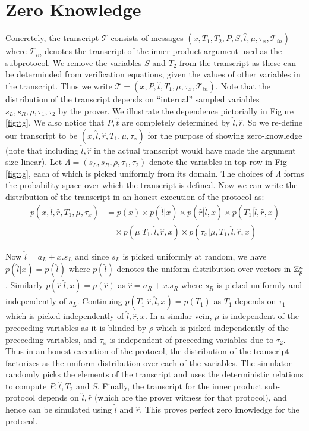 \documentclass[11pt]{article}
\newcommand{\mc}{\mathcal}
\begin{document}
\section{Zero Knowledge}
Concretely, the transcript $\mc{T}$ consists of messages
$(x,T_1,T_2,P,S,\hat{t},\mu,\tau_x,\mc{T}_{in})$ where $\mc{T}_{in}$ denotes the
transcript of the inner product argument used as the subprotocol. We remove the
variables $S$ and $T_2$ from the transcript as these can be determinded from
verification equations, given the values of other variables in the transcript.
Thus we write $\mc{T}=(x,P,\hat{t},T_1,\mu,\tau_x,\mc{T}_{in})$. Note that the
distribution of the transcript depends on ``internal'' sampled variables
$s_L,s_R,\rho,\tau_1,\tau_2$ by the prover. We illustrate the dependence
pictorially in Figure \ref{fig:tg}. We also notice that $P,\hat{t}$ are
completely determined by $\hat{l},\hat{r}$. So we re-define our transcript to
be $(x,\hat{l},\hat{r},T_1,\mu,\tau_x)$ for the purpose of showing
zero-knowledge (note that including $\hat{l},\hat{r}$ in the actual transcript
would have made the argument size linear). Let $\Lambda =
(s_L,s_R,\rho,\tau_1,\tau_2)$ denote the variables in top row in Fig
\ref{fig:tg}, each of which is picked uniformly from its domain. The choices of
$\Lambda$ forms the probability space over which the transcript is defined.
Now we can
write the distribution of the transcript in an honest execution of the protocol
as:
\begin{align}\label{eq:factor}
p(x,\hat{l},\hat{r},T_1,\mu,\tau_x) &= p(x)\times p(\hat{l}|x)\times p(\hat{r}|\hat{l},x)\times p(T_1|\hat{l},\hat{r},x) \nonumber \\ 
&\quad \times p(\mu|T_1,\hat{l},\hat{r},x)\times
  p(\tau_x|\mu,T_1,\hat{l},\hat{r},x)
\end{align}

Now $\hat{l} = a_L + x.s_L$ and since $s_L$ is picked
uniformly at random, we have
$p(\hat{l}|x)=p(\hat{l})$ where $p(\hat{l})$ denotes the uniform distribution
over vectors in $\mathbb{Z}_p^n$. Similarly $p(\hat{r}|\hat{l},x)=p(\hat{r})$ as
$\hat{r}=a_R + x.s_R$ where $s_R$ is picked uniformly and independently of
$s_L$. Continuing $p(T_1|\hat{r},\hat{l},x)=p(T_1)$ as $T_1$ depends on
$\tau_1$ which is picked independently of $\hat{l},\hat{r},x$. In a similar
vein, $\mu$ is independent of the preceeding variables as it is blinded by
$\rho$ which is picked independently of the preceeding variables, and $\tau_x$
is independent of preceeding variables due to $\tau_2$. Thus in an honest
execution of the protocol, the distribution of the transcript factorizes as the
uniform distribution over each of the variables. The simulator randomly picks
the elements of the transcript and uses the deterministic relations to compute
$P,\hat{t},T_2$ and $S$. Finally, the transcript for
the inner product sub-protocol depends on $\hat{l},\hat{r}$ (which are the
prover witness for that protocol), and hence can be simulated using $\hat{l}$
and $\hat{r}$. This proves perfect zero knowledge for the protocol.
\end{document}
